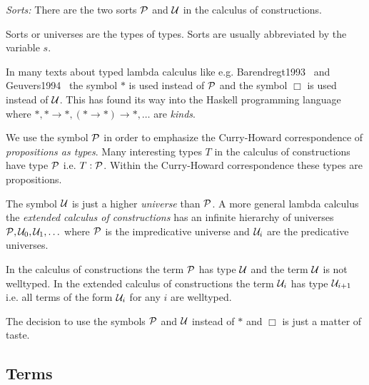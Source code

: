 \begin{definition}
    \emph{Sorts:} There are the two sorts ${\cal P}$ and ${\cal U}$ in the calculus of
    constructions.

    Sorts or universes are the types of types. Sorts are usually abbreviated by
    the variable $s$.
\end{definition}

In many texts about typed lambda calculus like e.g.
Barendregt1993~\cite{barendregt1993} and Geuvers1994~\cite{geuvers1994} the
symbol $*$ is used instead of ${\cal P}$ and the symbol $\Box$ is used instead of
${\cal U}$. This has found its way into the Haskell programming language where $*, *
\to *, (* \to *) \to *, \ldots$ are \emph{kinds}.

We use the symbol ${\cal P}$ in order to emphasize the Curry-Howard correspondence
of \emph{propositions as types}. Many interesting types $T$ in the calculus of
constructions have type ${\cal P}$ i.e. $T : {\cal P}$. Within the Curry-Howard
correspondence these types are propositions.

The symbol ${\cal U}$ is just a higher \emph{universe} than ${\cal P}$. A more general
lambda calculus the \emph{extended calculus of constructions} has an infinite
hierarchy of universes ${\cal P}, {\cal U}_0, {\cal U}_1, \ldots$ where ${\cal P}$ is the
impredicative universe and ${\cal U}_i$ are the predicative universes.

In the calculus of constructions the term ${\cal P}$ has type ${\cal U}$ and the term
${\cal U}$ is not welltyped. In the extended calculus of constructions the term
${\cal U}_i$ has type ${\cal U}_{i+1}$ i.e. all terms of the form ${\cal U}_i$ for any $i$
are welltyped.

The decision to use the symbols ${\cal P}$ and ${\cal U}$ instead of $*$ and $\Box$ is
just a matter of taste.



\subsection{Terms}

